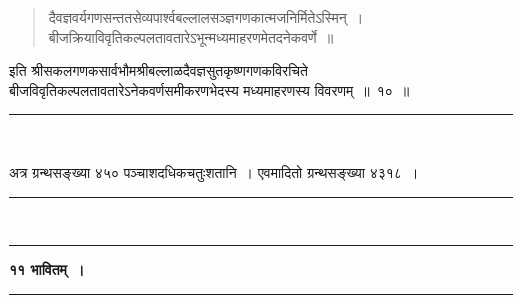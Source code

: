 \documentclass[11pt, openany]{book}
\begin{document}
\newpage

\begin{quote}
{\color{violet}दैवज्ञवर्यगणसन्ततसेव्यपार्श्वबल्लालसञ्ज्ञगणकात्मजनिर्मितेऽस्मिन्~।\\
बीजक्रियाविवृतिकल्पलतावतारेऽभून्मध्यमाहरणमेतदनेकवर्णे~॥}
\end{quote}
\vspace{-4mm}

\begin{center}
इति श्रीसकलगणकसार्वभौमश्रीबल्लाळदैवज्ञसुतकृष्णगणकविरचिते \\
बीजविवृतिकल्पलतावतारेऽनेकवर्णसमीकरणभेदस्य मध्यमाहरणस्य विवरणम्~॥~१०~॥
\vspace{2mm}

\rule{0.2\linewidth}{0.8pt}\\
\end{center}

अत्र ग्रन्थसङ्ख्या ४५० पञ्चाशदधिकचतुःशतानि~। एवमादितो ग्रन्थसङ्ख्या ४३१८~।

\begin{center}
\rule{0.2\linewidth}{0.8pt}\\
\vspace{-4mm}

\rule{0.2\linewidth}{0.8pt}
\end{center}

\newpage
\thispagestyle{empty}

\begin{center}
\textbf{\large ११\; भावितम्~।}\\
\rule{0.2\linewidth}{0.8pt}
\end{center}
\end{document}
